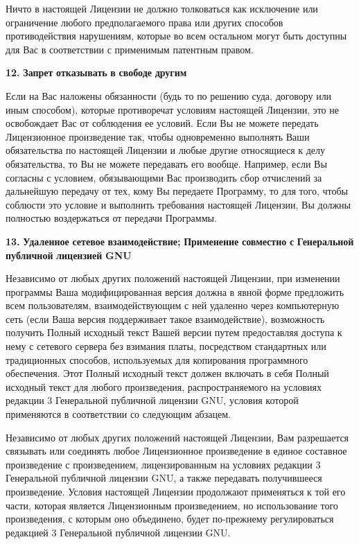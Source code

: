 Ничто в настоящей Лицензии не должно толковаться как исключение или ограничение любого предполагаемого права или других способов противодействия нарушениям, которые во всем остальном могут быть доступны для Вас в соответствии с применимым патентным правом.

{\bfseries{12.}} {\bfseries{Запрет}} {\bfseries{отказывать}} {\bfseries{в}} {\bfseries{свободе}} {\bfseries{другим}}

Если на Вас наложены обязанности (будь то по решению суда, договору или иным способом), которые противоречат условиям настоящей Лицензии, это не освобождает Вас от соблюдения ее условий. Если Вы не можете передать Лицензионное произведение так, чтобы одновременно выполнять Ваши обязательства по настоящей Лицензии и любые другие относящиеся к делу обязательства, то Вы не можете передавать его вообще. Например, если Вы согласны с условием, обязывающими Вас производить сбор отчислений за дальнейшую передачу от тех, кому Вы передаете Программу, то для того, чтобы соблюсти это условие и выполнить требования настоящей Лицензии, Вы должны полностью воздержаться от передачи Программы.

{\bfseries{13.}} {\bfseries{Удаленное}} {\bfseries{сетевое}} {\bfseries{взаимодействие;}} {\bfseries{Применение}} {\bfseries{совместно}} {\bfseries{с}} {\bfseries{Генеральной}} {\bfseries{публичной}} {\bfseries{лицензией}} {\bfseries{GNU}}

Независимо от любых других положений настоящей Лицензии, при изменении программы Ваша модифицированная версия должна в явной форме предложить всем пользователям, взаимодействующим с ней удаленно через компьютерную сеть (если Ваша версия поддерживает такое взаимодействие), возможность получить Полный исходный текст Вашей версии путем предоставляя доступа к нему с сетевого сервера без взимания платы, посредством стандартных или традиционных способов, используемых для копирования программного обеспечения. Этот Полный исходный текст должен включать в себя Полный исходный текст для любого произведения, распространяемого на условиях редакции 3 Генеральной публичной лицензии GNU, условия которой применяются в соответствии со следующим абзацем.

Независимо от любых других положений настоящей Лицензии, Вам разрешается связывать или соединять любое Лицензионное произведение в единое составное произведение с произведением, лицензированным на условиях редакции 3 Генеральной публичной лицензии GNU, а также передавать получившееся произведение. Условия настоящей Лицензии продолжают применяться к той его части, которая является Лицензионным произведением, но использование того произведения, с которым оно объединено, будет по-\/прежнему регулироваться редакцией 3 Генеральной публичной лицензии GNU.

